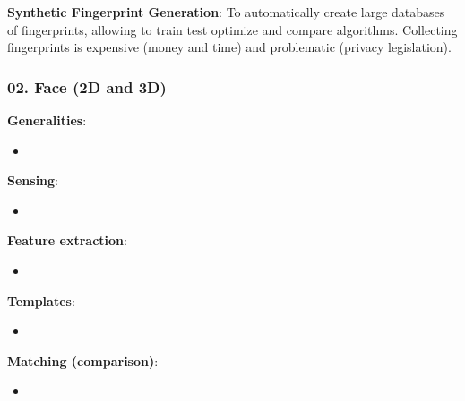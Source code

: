 \documentclass[a4paper]{article}
\begin{document}
      \textbf{Synthetic Fingerprint Generation}: To automatically create large databases of fingerprints, allowing to train test optimize and compare algorithms. Collecting fingerprints is expensive (money and time) and problematic (privacy legislation).
    \newpage
    \subsubsection*{02. Face (2D and 3D)}
      \textbf{Generalities}:
      \begin{itemize}
        \item 
      \end{itemize}

      \textbf{Sensing}:
      \begin{itemize}
        \item 
      \end{itemize}

      \textbf{Feature extraction}:
      \begin{itemize}
        \item 
      \end{itemize}

      \textbf{Templates}:
      \begin{itemize}
        \item 
      \end{itemize}

      \textbf{Matching (comparison)}:
      \begin{itemize}
        \item 
      \end{itemize}
    \newpage
\end{document}
